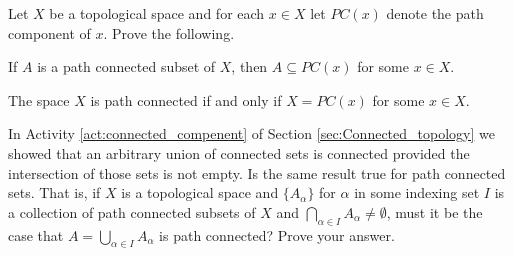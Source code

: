 \label{sec_path_exer}

\be

\item Let $X$ be a topological space and for each $x \in X$ let $PC(x)$ denote the path component of $x$. Prove the following.

\ba

\item If $A$ is a path connected subset of $X$, then $A \subseteq PC(x)$ for some $x \in X$.

\item The space $X$ is path connected if and only if $X = PC(x)$ for some $x \in X$.

\ea

\begin{comment}

\ExerciseSolution

\ba

\item Let $A$ be a path connected subset of $X$, and let $x \in A$. Since $PC(x)$ is the largest path connected subset of $X$ that contains $x$, it follows that $A \subseteq PC(x)$.

\item Suppose that $X$ is path connected. Then $X$ is a path connected subset of $X$, so part (a) shows that $X = PC(x)$ for some $x \in X$. Conversely, if $X = PC(x)$ for some $x \in X$, then $X$ is path connected since $PC(x)$ is path connected.

\ea


\end{comment}

\item In Activity \ref{act:connected_compenent} of Section \ref{sec:Connected_topology} we showed that an arbitrary union of connected sets is connected provided the intersection of those sets is not empty. Is the same result true for path connected sets. That is, if $X$ is a topological space and $\{A_{\alpha}\}$ for $\alpha$ in some indexing set $I$ is a collection of path connected subsets of $X$ and $\bigcap_{\alpha \in I} A_{\alpha} \neq \emptyset$, must it be the case that $A = \bigcup_{\alpha \in I} A_{\alpha}$ is path connected? Prove your answer. 

